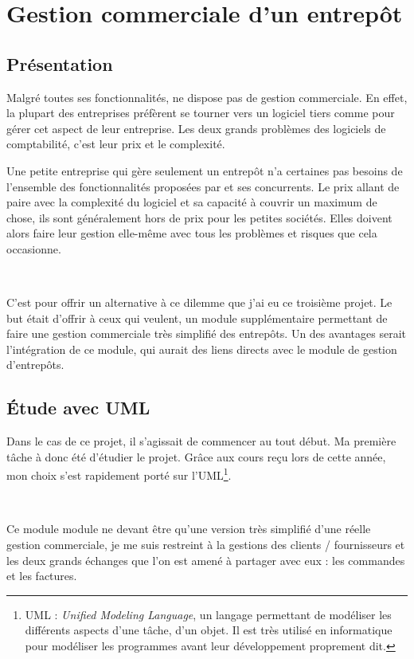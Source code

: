 \chapter{Gestion commerciale d'un entrepôt}
\section{Présentation}
Malgré toutes ses fonctionnalités, \integrale{} ne dispose pas de gestion commerciale. En effet, la plupart des entreprises préfèrent se tourner vers un logiciel  tiers comme  pour gérer cet aspect de leur entreprise. Les deux grands problèmes des logiciels de comptabilité, c'est leur prix et le complexité.

Une petite entreprise qui gère seulement un entrepôt n'a certaines pas besoins de l'ensemble des fonctionnalités proposées par  et ses concurrents. Le prix allant de paire avec la complexité du logiciel et sa capacité à couvrir un maximum de chose, ils sont généralement hors de prix pour les petites sociétés. Elles doivent alors faire leur gestion elle-même avec tous les problèmes et risques que cela occasionne.

~

C'est pour offrir un alternative à ce dilemme que j'ai eu ce troisième projet. Le but était d'offrir à ceux qui veulent, un module supplémentaire permettant de faire une gestion commerciale très simplifié des entrepôts. Un des avantages serait l'intégration de ce module, qui aurait des liens directs avec le module de gestion d'entrepôts.

\section{Étude avec UML}
Dans le cas de ce projet, il s'agissait de commencer au tout début. Ma première tâche à donc été d'étudier le projet. Grâce aux cours reçu lors de cette année, mon choix s'est rapidement porté sur l'UML\footnote{UML : \emph{Unified Modeling Language}, un \og langage \fg{} permettant de modéliser les différents aspects d'une tâche, d'un objet. Il est très utilisé en informatique pour modéliser les programmes avant leur développement proprement dit.}.

~

Ce module module ne devant être qu'une version très simplifié d'une \og réelle \fg{} gestion commerciale, je me suis restreint à la gestions des clients / fournisseurs et les deux grands échanges que l'on est amené à partager avec eux : les commandes et les factures.


